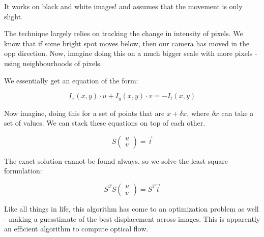 It works on black and white images! and assumes that the movement is only slight.

The technique largely relies on tracking the change in intensity of pixels. We know that if some bright spot moves below, then our camera has moved in the opp direction. Now, imagine doing this on a much bigger scale with more pixels - using neighbourhoods of pixels. 

We essentially get an equation of the form:

\begin{equation}
    I_x(x, y)\cdot u + I_y(x,y)\cdot v = -I_t(x, y)
\end{equation}

Now imagine, doing this for a set of points that are $x+\delta x$, where $\delta x$ can take a set of values. We can stack these equations on top of each other. 

\begin{equation}
    S\begin{pmatrix}
    u \\
    v
    \end{pmatrix} = \vec{t}
\end{equation}

The exact solution cannot be found always, so we solve the least square formulation:

\begin{equation}
    S^TS\begin{pmatrix}
    u \\
    v
    \end{pmatrix} = S^T\vec{t}
\end{equation}

Like all things in life, this algorithm has come to an optimization problem as well - making a guesstimate of the best displacement across images. This is apparently an efficient algorithm to compute optical flow.